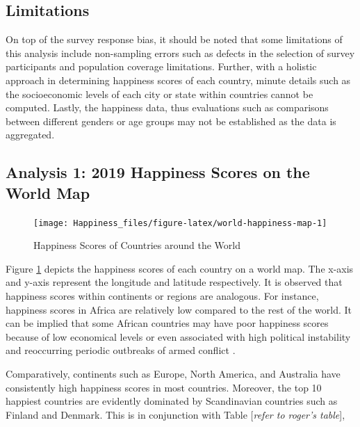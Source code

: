 \documentclass[11pt,a4paper,]{article}
\begin{document}
\clearpage

\hypertarget{limitations}{%
\subsection{Limitations}\label{limitations}}

On top of the survey response bias, it should be noted that some limitations of this analysis include non-sampling errors such as defects in the selection of survey participants and population coverage limitations. Further, with a holistic approach in determining happiness scores of each country, minute details such as the socioeconomic levels of each city or state within countries cannot be computed. Lastly, the happiness data, thus evaluations such as comparisons between different genders or age groups may not be established as the data is aggregated.

\clearpage

\hypertarget{analysis-1-2019-happiness-scores-on-the-world-map}{%
\subsection{Analysis 1: 2019 Happiness Scores on the World Map}\label{analysis-1-2019-happiness-scores-on-the-world-map}}

\begin{figure}

{\centering \texttt{[image: Happiness\_files/figure-latex/world-happiness-map-1]} 

}

\caption{Happiness Scores of Countries around the World}\label{fig:world-happiness-map}
\end{figure}

Figure \ref{fig:world-happiness-map} depicts the happiness scores of each country on a world map. The x-axis and y-axis represent the longitude and latitude respectively. It is observed that happiness scores within continents or regions are analogous. For instance, happiness scores in Africa are relatively low compared to the rest of the world. It can be implied that some African countries may have poor happiness scores because of low economical levels or even associated with high political instability and reoccurring periodic outbreaks of armed conflict \autocite{sachs2018world}.

Comparatively, continents such as Europe, North America, and Australia have consistently high happiness scores in most countries. Moreover, the top 10 happiest countries are evidently dominated by Scandinavian countries such as Finland and Denmark. This is in conjunction with Table {[}\emph{refer to roger's table}{]},
\end{document}
